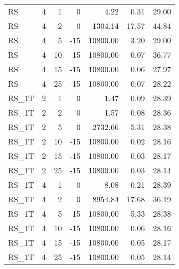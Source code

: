 \begin{center}
\begin{longtable}{lrrrrrr}
  RS     & 4 & 1 &   0 & 4.22 & 0.31 & 29.00 \\ 
  RS     & 4 & 2 &   0 & 1304.14 & 17.57 & 44.84 \\ 
  RS     & 4 & 5 & -15 & 10800.00 & 3.20 & 29.00 \\ 
  RS     & 4 & 10 & -15 & 10800.00 & 0.07 & 36.77 \\ 
  RS     & 4 & 15 & -15 & 10800.00 & 0.06 & 27.97 \\ 
  RS     & 4 & 25 & -15 & 10800.00 & 0.07 & 28.22 \\ 
  RS\_1T     & 2 & 1 &   0 & 1.47 & 0.09 & 28.39 \\ 
  RS\_1T     & 2 & 2 &   0 & 1.57 & 0.08 & 28.36 \\ 
  RS\_1T     & 2 & 5 &   0 & 2732.66 & 5.31 & 28.38 \\ 
  RS\_1T     & 2 & 10 & -15 & 10800.00 & 0.02 & 28.16 \\ 
  RS\_1T     & 2 & 15 & -15 & 10800.00 & 0.03 & 28.17 \\ 
  RS\_1T     & 2 & 25 & -15 & 10800.00 & 0.03 & 28.14 \\ 
  RS\_1T     & 4 & 1 &   0 & 8.08 & 0.21 & 28.39 \\ 
  RS\_1T     & 4 & 2 &   0 & 8954.84 & 17.68 & 36.19 \\ 
  RS\_1T     & 4 & 5 & -15 & 10800.00 & 5.33 & 28.38 \\ 
  RS\_1T     & 4 & 10 & -15 & 10800.00 & 0.06 & 28.16 \\ 
  RS\_1T     & 4 & 15 & -15 & 10800.00 & 0.05 & 28.17 \\ 
  RS\_1T     & 4 & 25 & -15 & 10800.00 & 0.05 & 28.14 \\ 
\end{longtable}
\end{center}

